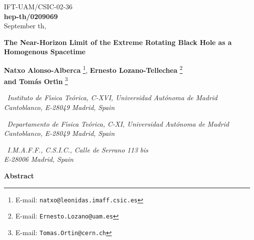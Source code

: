 \documentclass[12pt,a4paper]{article}
\begin{document}
\begin{flushright}
\small
IFT-UAM/CSIC-02-36\\
{\bf hep-th/0209069}\\
September \coordHE{}th, \coordHE{}
\normalsize
\end{flushright}

\begin{center}


\vspace{2cm}

{\Large {\bf The Near-Horizon Limit of the Extreme Rotating \coordHE{}
    Black Hole as a Homogenous Spacetime}}

\vspace{2cm}

{\bf\large Natxo Alonso-Alberca}\myHighlight{${}^{\spadesuit\heartsuit}$}\coordHE{}
\footnote{E-mail: {\tt natxo@leonidas.imaff.csic.es}},
{\bf\large Ernesto Lozano-Tellechea}\myHighlight{${}^{\spadesuit\heartsuit}$}\coordHE{}
\footnote{E-mail: {\tt Ernesto.Lozano@uam.es}}\\
{\bf\large and Tom{\'a}s Ort\'{\i}n}\myHighlight{${}^{\spadesuit\clubsuit}$}\coordHE{}
\footnote{E-mail: {\tt Tomas.Ortin@cern.ch}}

\vspace{1cm}

\myHighlight{${}^{\spadesuit}$}\coordHE{}\ {\it Instituto de F\'{\i}sica Te{\'o}rica, C-XVI,
Universidad Aut{\'o}noma de Madrid\\
Cantoblanco, E-28049 Madrid, Spain}

\vskip 0.2cm
\myHighlight{${}^{\heartsuit}$}\coordHE{}\ {\it Departamento de F\'{\i}sica Te{\'o}rica, C-XI,
Universidad Aut{\'o}noma de Madrid\\
Cantoblanco, E-28049 Madrid, Spain}

\vskip 0.2cm
\myHighlight{${}^{\clubsuit}$}\coordHE{}\ {\it I.M.A.F.F., C.S.I.C., 
Calle de Serrano 113 bis\\ 
E-28006 Madrid, Spain}
\vspace{.7cm}






{\bf Abstract}

\end{center}
\end{document}
